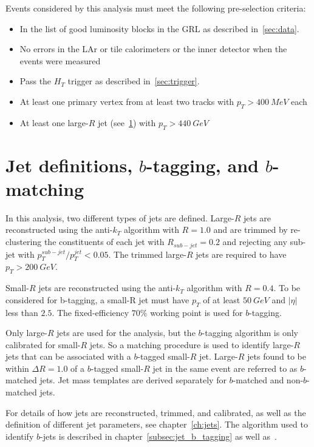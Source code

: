 Events considered by this analysis must meet the following pre-selection criteria:

\begin{itemize}
    \item In the list of good luminosity blocks in the GRL as described in~\ref{sec:data}.
    \item No errors in the LAr or tile calorimeters or the inner detector when the events were measured
    \item Pass the $H_{T}$ trigger as described in~\ref{sec:trigger}.
    \item At least one primary vertex from at least two tracks with $p_{T}>400~MeV$ each
    \item At least one large-$R$ jet (see~\ref{sec:jet_definitions}) with $p_{T}>440~GeV$
\end{itemize}

\section{Jet definitions, $b$-tagging, and $b$-matching}\label{sec:jet_definitions}

In this analysis, two different types of jets are defined.
Large-$R$ jets are reconstructed using the anti-$k_{T}$ algorithm with $R=1.0$ and are trimmed by re-clustering the constituents of each jet with $R_{sub-jet}=0.2$ and rejecting any sub-jet with $p_{T}^{sub-jet}/p_{T}^{jet}<0.05$.
The trimmed large-$R$ jets are required to have $p_{T}>200~GeV$.

Small-$R$ jets are reconstructed using the anti-$k_{T}$ algorithm with $R=0.4$.
To be considered for b-tagging, a small-R jet must have $p_{T}$ of at least $50~GeV$ and $|\eta|$ less than $2.5$.
The fixed-efficiency $70\%$ working point is used for $b$-tagging.

Only large-$R$ jets are used for the analysis, but the $b$-tagging algorithm is only calibrated for small-$R$ jets.
So a matching procedure is used to identify large-$R$ jets that can be associated with a $b$-tagged small-$R$ jet.
Large-$R$ jets found to be within $\Delta R=1.0$ of a $b$-tagged small-$R$ jet in the same event are referred to as $b$-matched jets.
Jet mass templates are derived separately for $b$-matched and non-$b$-matched jets.

For details of how jets are reconstructed, trimmed, and calibrated, as well as the definition of different jet parameters, see chapter~\ref{ch:jets}.
The algorithm used to identify $b$-jets is described in chapter~\ref{subsec:jet_b_tagging} as well as~\cite{b-jet-perf-1,b-jet-perf-2}.

